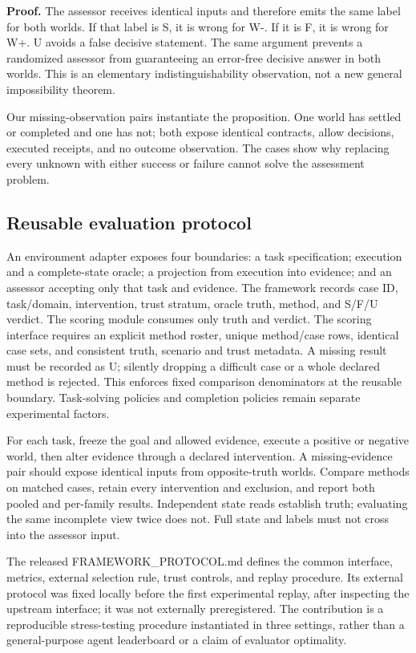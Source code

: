 \documentclass[11pt]{article}
\begin{document}
\textbf{Proof.} The assessor receives identical inputs and therefore emits the same label for both worlds. If that label is S, it is wrong for W-. If it is F, it is wrong for W+. U avoids a false decisive statement. The same argument prevents a randomized assessor from guaranteeing an error-free decisive answer in both worlds. This is an elementary indistinguishability observation, not a new general impossibility theorem.

Our missing-observation pairs instantiate the proposition. One world has settled or completed and one has not; both expose identical contracts, allow decisions, executed receipts, and no outcome observation. The cases show why replacing every unknown with either success or failure cannot solve the assessment problem.

\subsection{Reusable evaluation protocol}
An environment adapter exposes four boundaries: a task specification; execution and a complete-state oracle; a projection from execution into evidence; and an assessor accepting only that task and evidence. The framework records case ID, task/domain, intervention, trust stratum, oracle truth, method, and S/F/U verdict. The scoring module consumes only truth and verdict. The scoring interface requires an explicit method roster, unique method/case rows, identical case sets, and consistent truth, scenario and trust metadata. A missing result must be recorded as U; silently dropping a difficult case or a whole declared method is rejected. This enforces fixed comparison denominators at the reusable boundary. Task-solving policies and completion policies remain separate experimental factors.

For each task, freeze the goal and allowed evidence, execute a positive or negative world, then alter evidence through a declared intervention. A missing-evidence pair should expose identical inputs from opposite-truth worlds. Compare methods on matched cases, retain every intervention and exclusion, and report both pooled and per-family results. Independent state reads establish truth; evaluating the same incomplete view twice does not. Full state and labels must not cross into the assessor input.

The released FRAMEWORK\_PROTOCOL.md defines the common interface, metrics, external selection rule, trust controls, and replay procedure. Its external protocol was fixed locally before the first experimental replay, after inspecting the upstream interface; it was not externally preregistered. The contribution is a reproducible stress-testing procedure instantiated in three settings, rather than a general-purpose agent leaderboard or a claim of evaluator optimality.
\end{document}
